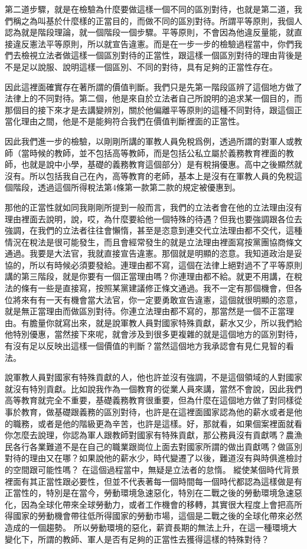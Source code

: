 \documentclass[]{ctexbook}
\begin{document}
第二道步驟，就是在檢驗為什麼要做這樣一個不同的區別對待，也就是第二道，我們稱之為叫基於什麼樣的正當目的，而做不同的區別對待。所謂平等原則，我個人認為就是階段理論，就一個階段一個步驟。平等原則，不會因為他違反量能，就直接違反憲法平等原則，所以就宣告違憲。而是在一步一步的檢驗過程當中，你們我們去檢視立法者做這樣一個區別對待的正當性，跟這樣一個區別對待的理由背後是不是足以說服、說明這樣一個區別、不同的對待，具有足夠的正當性存在。

因此這裡面確實存在著所謂的價值判斷。我們只是先第一階段區辨了這個地方做了法律上的不同對待。第二個，他是來自於立法者自己所說明的追求某一個目的，而那個目的接下來才是去講變辨別，關於他偏離平等原則的這種不同對待，跟這個正當化理由之間，他是不是能夠符合我們在價值判斷裡面的正當性。

因此我們進一步的檢驗，以剛剛所講的軍教人員免稅爲例，透過所謂的對軍人或教師（當時候的教師，並不包括高等教師，而是包括公私立屬於義務教育裡面的教師，也就是說中小學，基礎的義務教育這個部分）是有稅捐優惠。高中之後顯然就沒有。所以包括我自己在內，高等教育的老師，基本上是沒有在軍教人員的免稅這個階段，透過這個所得稅法第4條第一款第二款的規定被優惠到。

那他的正當性就如同我剛剛所提到一般而言，我們的立法者會在他的立法理由沒有理由裡面去說明，說，哎，為什麼要給他一個特殊的待遇？但我也要強調跟各位去強調，在我們的立法者往往會懶惰，甚至是恣意到連交代立法理由都不交代，這種情況在稅法是很可能發生，而且會經常發生的就是立法理由裡面寫按黨團協商條文通過。我要是大法官，我就直接宣告違憲。那個就是明顯的恣意。我知道政治是妥協的，所以有時候必須要發給。連理由都不寫，這個在法律上絕對過不了平等原則講的第三階段，就是你要有一個正當理由嗎？你連理由都不給。就更不用講，在稅法的條有一些是直接寫，按照某黨建議修正條文通過。我不一定有那個機會，但各位將來有有一天有機會當大法官，你一定要勇敢宣告違憲，這個就很明顯的恣意，就是無正當理由而做區別對待。你連立法理由都不寫的，那當然是一個不正當理由。有膽量你就寫出來，就是說軍教人員對國家特殊貢獻，薪水又少，所以我們給他特別優惠，當然接下來呢，就會涉及到很多更複雜的就是這個地方的區別對待，有沒有足以反映出這樣一個價值的判斷？當然這個地方我承認會有見仁見智的看法。

說軍教人員對國家有特殊貢獻的人，他也許並沒有強調，不是這個領域的人對國家就沒有特別貢獻。比如說我作為一個教育的從業人員來講，當然不會說，因此我們高等教育就完全不重要，基礎義務教育很重要，但為什麼在這個地方做了對同樣從事於教育，做基礎跟義務的區別對待，也許是在這裡面國家認為他的薪水或者是他的職務，或者是他的階級更為辛苦，也許是這樣。好，那就看，如果個案裡面就看你怎麼去說理，你認為軍人跟教師對國家有特殊貢獻，那公務員沒有貢獻嗎？農漁民各行各業難道不是在自己的職業跟崗位上面去對國家所謂的做出貢獻嗎？做區別對待的理由又在哪？如果說他的薪水少，時代變遷了以後，難道沒有與時俱進檢討的空間跟可能性嗎？ 在這個過程當中，無疑是立法者的怠惰。
縱使某個時代背景裡面有其正當性跟必要性，但並不代表著每一個時間每一個時代都認為這樣做是有正當性的，特別是在當今，勞動環境急速惡化，特別在二戰之後的勞動環境急速惡化，因為全球化帶來全球勞動力，或者工作機會的移轉，其實很大程度上會把高所得國家的勞動機會帶往低所得國家的勞動市場，這個是二戰之後的全球化帶來必然造成的一個趨勢。
所以勞動環境的惡化，薪資長期的無法上升，在這一種環境大變化下，所謂的教師、軍人是否有足夠的正當性去獲得這樣的特殊對待？
\end{document}
